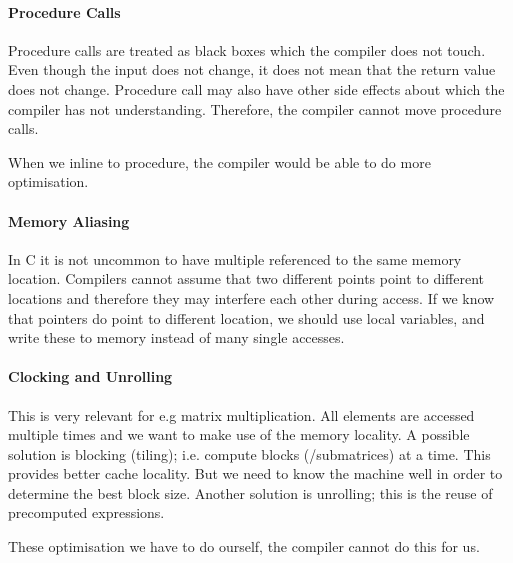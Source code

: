 \paragraph{Procedure Calls}
Procedure calls are treated as black boxes which the compiler does not touch. Even though the input does not change, it does not mean that the return value does not change. Procedure call may also have other side effects about which the compiler has not understanding. Therefore, the compiler cannot move procedure calls. 

When we inline to procedure, the compiler would be able to do more optimisation.

\paragraph{Memory Aliasing}
In C it is not uncommon to have multiple referenced to the same memory location. Compilers cannot assume that two different points point to different locations and therefore they may interfere each other during access. If we know that pointers do point to different location, we should use local variables, and write these to memory instead of many single accesses.

\paragraph{Clocking and Unrolling}
This is very relevant for e.g matrix multiplication. All elements are accessed multiple times and we want to make use of the memory locality. A possible solution is blocking (tiling); i.e. compute blocks (/submatrices) at a time. This provides better cache locality. But we need to know the machine well in order to determine the best block size. Another solution is unrolling; this is the reuse of precomputed expressions.

These optimisation we have to do ourself, the compiler cannot do this for us.

